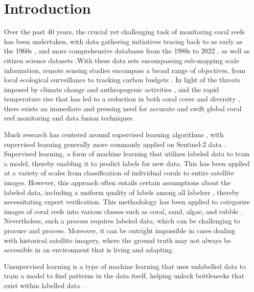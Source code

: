 \documentclass[journal,article,submit,pdftex,moreauthors]{Definitions/mdpi}
\begin{document}

\section{Introduction}

Over the past 40 years, the crucial yet challenging task of monitoring coral reefs has been undertaken, with data gathering initiatives tracing back to as early as the 1960s \cite{goreau1964mass}, and more comprehensive databases from the 1980s to 2022 \cite{Woesik2022},  as well as
citizen science datasets \cite{ALA2021}.With these data sets encompassing sub-mapping scale information, remote sensing studies encompass a broad range of objectives, from local ecological surveillance to tracking carbon budgets \cite{duarte2017reviews}. In light of the threats imposed 
by climate change and anthropogenic activities \cite{hughes2010rising}, 
and the rapid temperature rise that has led to a reduction in both coral cover and diversity \cite{bruno2007thermal} \cite{pandolfi2003global} \cite{hoegh2007coral}, there exists an immediate and pressing need for accurate and swift global coral reef monitoring and data fusion techniques.


Much research has centered around supervised learning algorithms \cite{su14106161} \cite{white2021coral} \cite{pavoni2022taglab} \cite{zeng2022spectral}, with supervised learning generally more commonly applied on Sentinel-2 data \cite{phiri2020sentinel}. 
Supervised learning, a form of machine learning that utilizes labeled data to train a model, thereby enabling it to predict labels for new data.
This has been applied at a variety of scales from classification of individual corals to entire satellite images. However, this approach often entails certain assumptions about the labeled data, including a uniform quality of labels among all labelers \cite{sheng2008get}, 
thereby necessitating expert verification. This methodology has been applied to categorize images of coral reefs into various classes such as coral, sand, algae, and rubble \cite{Li2020}. 
Nevertheless, such a process requires labeled data, which can be challenging to procure and process. Moreover, it can be outright impossible in cases dealing with historical satellite imagery, where the ground truth may not always be accessible in an environment that is living and adapting.


Unsupervised learning is a type of machine learning that uses unlabelled data to train a model to find patterns in the data itself, helping unlock bottlenecks that exist within labelled data \cite{usama2019unsupervised}.
\end{document}
